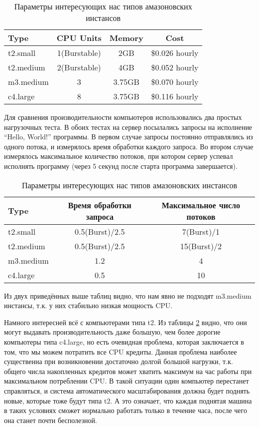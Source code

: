 \begin{table}[h]
	\centering
	\begin{tabular}{l|c|c|c}
		Type      & CPU Units    & Memory & Cost\\ \hline
		t2.small  & 1(Burstable) & 2GB    & \$0.026 hourly\\ \hline
		t2.medium & 2(Burstable) & 4GB    & \$0.052 hourly\\ \hline
		m3.medium & 3            & 3.75GB & \$0.070 hourly\\ \hline
		c4.large  & 8            & 3.75GB & \$0.116 hourly\\
	\end{tabular}
	\caption{Параметры интересующих нас типов амазоновских инстансов}
	\label{table:instance_types}
\end{table}
	
	Для сравнения производительности компьютеров использовались два простых нагрузочных теста. В обоих тестах на сервер посылались запросы на исполнение ``Hello, World!'' программы. В первом случае запросы постоянно отправлялись из одного потока, и измерялось время обработки каждого запроса. Во втором случае измерялось максимальное количество потоков, при котором сервер успевал исполнять программу (через 5 секунд после старта программа завершается).
	
\begin{table}[h]
	\centering
	\begin{tabular}{l|c|c}
		Type      & Время обработки запроса    & Максимальное число потоков\\ \hline
		t2.small  & 0.5(Burst)/2.5             & 7(Burst)/1  \\ \hline
		t2.medium & 0.5(Burst)/2.5             & 15(Burst)/2 \\ \hline
		m3.medium & 1.2                        & 4           \\ \hline
		c4.large  & 0.5                        & 10          \\
	\end{tabular}
	\caption{Параметры интересующих нас типов амазоновских инстансов}
	\label{table:instance_types_performance}
\end{table}

	Из двух приведённых выше таблиц видно, что нам явно не подходят m3.medium инстансы, т.к. у них стабильно низкая мощность CPU.
	
	Намного интересней всё с компьютерами типа t2. Из таблицы \ref{table:instance_types_performance}	 видно, что они могут выдавать производительность даже большую, чем более дорогие компьютеры типа c4.large, но есть очевидная проблема, которая заключается в том, что мы можем потратить все CPU кредиты. Данная проблема наиболее существенна при возникновении достаточно долгой большой нагрузки, т.к. общего числа накопленных кредитов может хватить максимум на час работы при максимальном потреблении CPU. В такой ситуации один компьютер перестанет справляться, и система автоматического масштабирования должна будет поднять новые, которые тоже будут типа t2. А это означает, что каждая поднятая машина в таких условиях сможет нормально работать только в течение часа, после чего она станет почти бесполезной. 
	
